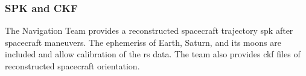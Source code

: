 \documentclass[crop=false,class=article,oneside]{standalone}
\begin{document}
        \subsubsection{\footnotesize SPK and CKF}
            The Navigation Team provides a reconstructed
            spacecraft trajectory \gls{spk} after spacecraft
            maneuvers. The \glspl{ephemeris} of Earth, Saturn,
            and its moons are included and allow
             calibration of
            the \gls{rs} data. The team also provides
            \gls{ckf} files of reconstructed spacecraft
            orientation. 
\end{document}
